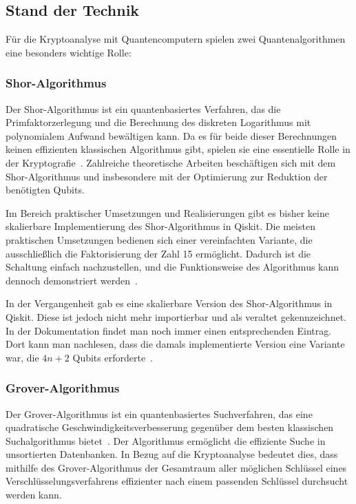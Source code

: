 \documentclass[lettersize,journal]{IEEEtran}
\begin{document}
\subsection{Stand der Technik}

Für die Kryptoanalyse mit Quantencomputern spielen zwei Quantenalgorithmen eine besonders wichtige Rolle:

\subsubsection{Shor-Algorithmus}
Der Shor-Algorithmus ist ein quantenbasiertes Verfahren,
das die Primfaktorzerlegung und die Berechnung des diskreten Logarithmus
mit polynomialem Aufwand bewältigen kann.
Da es für beide dieser Berechnungen keinen effizienten klassischen Algorithmus gibt,
spielen sie eine essentielle Rolle in der Kryptografie~\cite{Shor:1997}.
Zahlreiche theoretische Arbeiten beschäftigen sich mit dem Shor-Algorithmus und
insbesondere mit der Optimierung zur Reduktion der benötigten Qubits.

Im Bereich praktischer Umsetzungen und Realisierungen
gibt es bisher keine skalierbare Implementierung des Shor-Algorithmus in Qiskit.
Die meisten praktischen Umsetzungen bedienen sich einer vereinfachten Variante,
die ausschließlich die Faktorisierung der Zahl 15 ermöglicht.
Dadurch ist die Schaltung einfach nachzustellen,
und die Funktionsweise des Algorithmus kann dennoch demonstriert werden~\cite{9376169, Monz_2016, IBM:Shor}.

In der Vergangenheit gab es eine skalierbare Version des Shor-Algorithmus in Qiskit.
Diese ist jedoch nicht mehr importierbar und als veraltet gekennzeichnet.
In der Dokumentation findet man noch immer einen entsprechenden Eintrag.
Dort kann man nachlesen, dass die damals implementierte Version eine Variante war,
die \(4n+2\) Qubits erforderte~\cite{IBM:Shor_docu}.

\subsubsection{Grover-Algorithmus}
Der Grover-Algorithmus ist ein quantenbasiertes Suchverfahren,
das eine quadratische Geschwindigkeitsverbesserung
gegenüber dem besten klassischen Suchalgorithmus bietet~\cite{grover1996fast}.
Der Algorithmus ermöglicht die effiziente Suche in unsortierten Datenbanken.
In Bezug auf die Kryptoanalyse bedeutet dies,
dass mithilfe des Grover-Algorithmus der Gesamtraum aller möglichen Schlüssel
eines Verschlüsselungsverfahrens effizienter nach einem passenden Schlüssel durchsucht werden kann.
\end{document}
